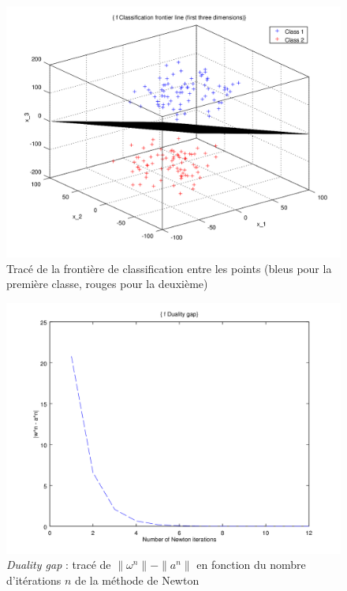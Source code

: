 \documentclass{article}
\begin{document}
         \begin{figure}
           \begin{center}
             \includegraphics[scale=0.5]{images/plane4.png}
             \caption{Tracé de la frontière de classification entre les points (bleus pour la première classe, rouges pour la deuxième)}
           \end{center}
         \end{figure}

         \begin{figure}
           \begin{center}
             \includegraphics[scale=0.5]{images/duality4.png}
             \caption{\emph{Duality gap} : tracé de $\|\omega^n\| - \|a^n\|$ en fonction du nombre d'itérations $n$ de la méthode de Newton}
           \end{center}
         \end{figure}
\end{document}

